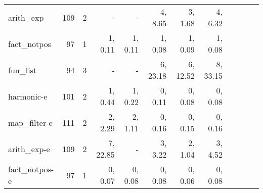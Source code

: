 \begin{table*}
\begin{center}
\begin{tabular}{|l|r|r|r|r|r|r|r|r|r|r|r|}
arith\_exp        &  109 & 2 &           - &           - &  4,    8.65 &  3,    1.68 &  4,    6.32 \\
fact\_notpos      &   97 & 1 &  1,    0.11 &  1,    0.11 &  1,    0.08 &  1,    0.09 &  1,    0.08 \\
fun\_list         &    94& 3 &           - &           - &  6,   23.18 &  6,   12.52 &  8,   33.15 \\
harmonic-e        &  101 & 2 &  1,    0.44 &  1,    0.22 &  0,    0.11 &  0,    0.08 &  0,    0.08 \\
map\_filter-e     &  111 & 2 &  2,    2.29 &  2,    1.11 &  0,    0.16 &  0,    0.15 &  0,    0.16 \\
arith\_exp-e      &  109 & 2 &  7,   22.85 &           - &  3,    3.22 &  2,    1.04 &  3,    4.52 \\
fact\_notpos-e    &   97 & 1 &  0,    0.07 &  0,    0.08 &  0,    0.08 &  0,    0.06 &  0,    0.08 \\
\hline
\end{tabular}
\end{center}
\end{table*}

